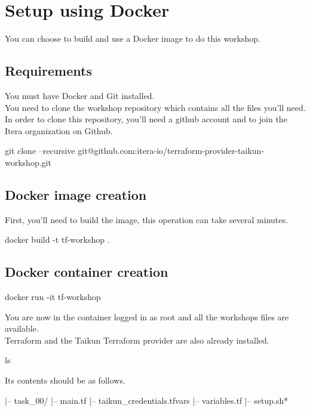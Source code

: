 \section{Setup using Docker}\label{sec:docker}

You can choose to build and use a Docker image to do this workshop.

\subsection{Requirements}

You must have Docker and Git installed.\\
You need to clone the workshop repository which contains all the files you'll need.\\
In order to clone this repository, you'll need a github account and to join the Itera organization on Github.

\begin{shell}
git clone --recursive git@github.com:itera-io/terraform-provider-taikun-workshop.git
\end{shell}

\subsection{Docker image creation}

First, you'll need to build the image, this operation can take several minutes.

\begin{shell}
docker build -t tf-workshop .
\end{shell}

\subsection{Docker container creation}

\begin{shell}
docker run -it tf-workshop
\end{shell}
You are now in the container logged in as root and all the workshops files are available.\\
Terraform and the Taikun Terraform provider are also already installed.

\begin{shell}
ls
\end{shell}
Its contents should be as follows.
\begin{raw}
|-- task_00/
    |-- main.tf
    |-- taikun_credentials.tfvars
    |-- variables.tf
|-- setup.sh*
\end{raw}


